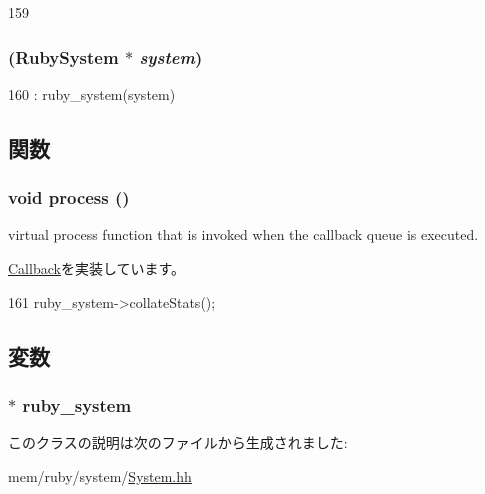 \begin{DoxyCode}
159 {}
\end{DoxyCode}
\hypertarget{classRubyStatsCallback_a99197472a406321ad0919d3b9f54572e}{
\subsubsection[{RubyStatsCallback}]{ ({\bf RubySystem} $\ast$ {\em system})}}
\label{classRubyStatsCallback_a99197472a406321ad0919d3b9f54572e}



\begin{DoxyCode}
160 : ruby_system(system) {}
\end{DoxyCode}


\subsection{関数}
\hypertarget{classRubyStatsCallback_a2e9c5136d19b1a95fc427e0852deab5c}{
\subsubsection[{process}]{\setlength{\rightskip}{0pt plus 5cm}void process ()}}
\label{classRubyStatsCallback_a2e9c5136d19b1a95fc427e0852deab5c}
virtual process function that is invoked when the callback queue is executed. 

\hyperlink{classCallback_a142b75b68a6291400e20fb0dd905b1c8}{Callback}を実装しています。


\begin{DoxyCode}
161 { ruby_system->collateStats(); }
\end{DoxyCode}


\subsection{変数}
\hypertarget{classRubyStatsCallback_a88928242e9a532cb6f4abe42dd8240a7}{
\subsubsection[{ruby\_\-system}]{$\ast$ {\bf ruby\_\-system}}}
\label{classRubyStatsCallback_a88928242e9a532cb6f4abe42dd8240a7}


このクラスの説明は次のファイルから生成されました:\begin{DoxyCompactItemize}
\item 
mem/ruby/system/\hyperlink{System_8hh}{System.hh}\end{DoxyCompactItemize}
